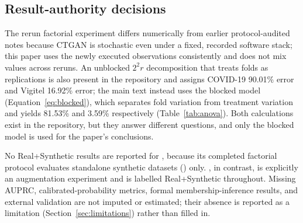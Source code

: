 \subsection{Result-authority decisions}

The rerun factorial experiment differs numerically from earlier protocol-audited notes because CTGAN is stochastic even under a fixed, recorded software stack; this paper uses the newly executed observations consistently and does not mix values across reruns. An unblocked $2^2r$ decomposition that treats folds as replications is also present in the repository and assigns COVID-19 90.01\% error and Vigitel 16.92\% error; the main text instead uses the blocked model (Equation~\ref{eq:blocked}), which separates fold variation from treatment variation and yields 81.53\% and 3.59\% respectively (Table~\ref{tab:anova}). Both calculations exist in the repository, but they answer different questions, and only the blocked model is used for the paper's conclusions.

No Real+Synthetic results are reported for \sepa{}, because its completed factorial protocol evaluates standalone synthetic datasets (\tstr{}) only. \dacpf{}, in contrast, is explicitly an augmentation experiment and is labelled Real+Synthetic throughout. Missing AUPRC, calibrated-probability metrics, formal membership-inference results, and external validation are not imputed or estimated; their absence is reported as a limitation (Section~\ref{sec:limitations}) rather than filled in.
